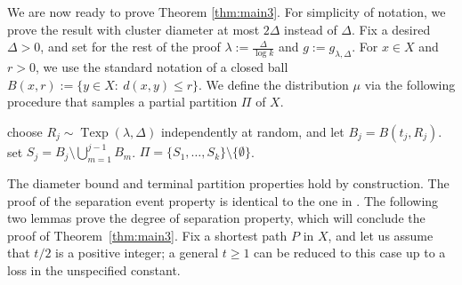 \documentclass[twoside,leqno,twocolumn]{article}
\providecommand{\eqdef}{:=}
\DeclareMathOperator{\texp}{Texp}
\begin{document}
We are now ready to prove Theorem \ref{thm:main3}. For simplicity of notation, we prove the result with cluster diameter at most $2 \Delta$ instead of $\Delta$.
Fix a desired $\Delta>0$,
and set for the rest of the proof $\lambda\eqdef\frac{\Delta}{\log k}$ 
and $g \eqdef g_{\lambda,\Delta}$. 
For $x \in X$ and $r> 0$, we use the standard notation of a closed ball
$B(x,r) \eqdef \{y \in X:\ d(x,y) \le r\}$. 
We define the distribution $\mu$ via the following procedure that samples 
a partial partition $\Pi$ of $X$.
\begin{algorithm}[H]
\begin{algorithmic}[1]
\STATE choose $R_j \sim \texp(\lambda,\Delta)$ independently at random, and let $B_j = B(t_j,R_j)$.
\STATE set $S_j = B_j \setminus \bigcup_{m=1}^{j-1}B_m$.
\ENDFOR
\RETURN $\Pi = \{ S_1,\ldots,S_k\} \setminus \{\emptyset\}$.
\end{algorithmic}
\end{algorithm}
The diameter bound and terminal partition properties hold by construction. The proof of the separation event property is identical to the one in \cite[Section 3]{Bartal96}.
The following two lemmas prove the degree of separation property, 
which will conclude the proof of Theorem~\ref{thm:main3}. 
Fix a shortest path $P$ in $X$,
and let us assume that $t/2$ is a positive integer;
a general $t\ge1$ can be reduced to this case up to a loss
in the unspecified constant.
\end{document}

